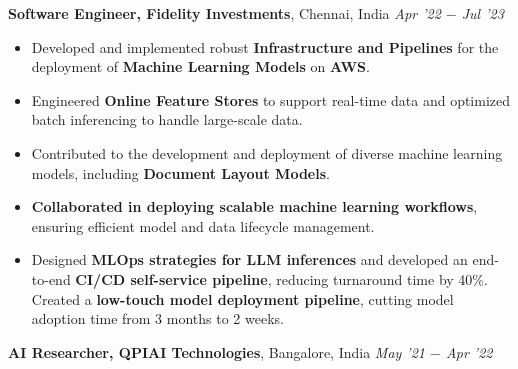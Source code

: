 \documentclass[10pt,a4]{article}
\begin{document}
{\begin{flushleft}
    \vspace{0.5mm}
    \hspace{1.5mm} \textbf{\large Software Engineer, Fidelity Investments},  Chennai, India \hfill \textit{\large Apr '22 $-$ Jul '23}	\\
    \begin{itemize}
        \item Developed and implemented robust \textbf{Infrastructure and Pipelines} for the deployment of \textbf{Machine Learning Models} on \textbf{AWS}.  
         \item Engineered \textbf{Online Feature Stores} to support real-time data and optimized batch inferencing to handle large-scale data.
         \item Contributed to the development and deployment of diverse machine learning models, including \textbf{Document Layout Models}.
        \item \textbf{Collaborated in deploying scalable machine learning workflows}, ensuring efficient model and data lifecycle management.
        \item Designed \textbf{MLOps strategies for LLM inferences} and developed an end-to-end \textbf{CI/CD self-service pipeline}, reducing turnaround time by 40\%. Created a \textbf{low-touch model deployment pipeline}, cutting model adoption time from 3 months to 2 weeks.
    \end{itemize}	

    \vspace{0.5mm}
    \hspace{1.5mm} \textbf{\large AI Researcher, QPIAI Technologies},  Bangalore, India \hfill \textit{\large May '21 $-$ Apr '22}	\\
    \begin{itemize}
          

\end{itemize}
\end{flushleft}}
\end{document}

